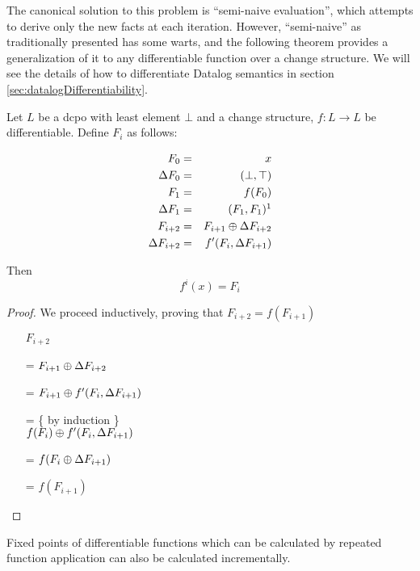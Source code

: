 The canonical solution to this problem is ``semi-naive evaluation'', which
attempts to derive only the new facts at each iteration. However, ``semi-naive''
as traditionally presented has some warts, and
the following theorem provides a generalization of it to any differentiable function over a
change structure. We will see the details of how to differentiate Datalog
semantics in section \ref{sec:datalogDifferentiability}.

\begin{thm}
\label{thm:diffIter}
  Let $L$ be a dcpo with least element $\bot$ and a change structure, $f: L \rightarrow L$ be
  differentiable. Define $F_i$ as follows:

  \begin{eqnarray*}
  F_0 & = & x\\
  \Delta F_0 & = & (\bot, \top) \\
  F_1 & = & f(F_0)\\
  \Delta F_1 & = & (F_1, F_1) \footnotemark \\
  F_{i+2} & = & F_{i+1} \cplus \Delta F_{i+2} \\
  \Delta F_{i+2} & = & \derive{f}(F_i, \Delta F_{i+1}) \\
  \end{eqnarray*}

  Then 
  $$f^i(x) = F_i$$
\end{thm}


\begin{proof}
We proceed inductively, proving that $F_{i+2} = f(F_{i+1})$

\begin{itemize}
\item[ ]$F_{i+2}$
\item[=]
$
F_{i+1} \oplus \Delta F_{i+2}
$
\item[=]
$
F_{i+1} \oplus f'( F_i, \Delta F_{i+1})
$
\item[=] \{ by induction \}\\
$
f(F_i) \oplus f'(F_i, \Delta F_{i+1})
$
\item[=]
$
f(F_i \oplus \Delta F_{i+1})
$ 
\item[=]
$f(F_{i+1})$
\end{itemize}
\end{proof}

\begin{corollary}
\label{corollary:diffFP}
  Fixed points of differentiable functions which can be calculated by repeated
  function application can also be calculated incrementally.
\end{corollary}

